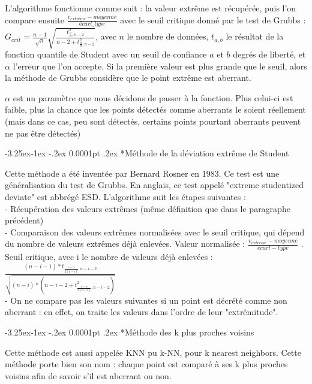 \documentclass[a4paper,12pt]{article} %
\makeatletter
\renewcommand\subparagraph{\@startsection{subparagraph}{5}{\z@}%
                                      {-3.25ex\@plus -1ex \@minus -.2ex}%
                                      {0.0001pt \@plus .2ex}%
                                      {\normalfont\normalsize\bfseries}}
\makeatother
\begin{document}
                        L'algorithme fonctionne comme suit : la valeur extrême est récupérée, puis l'on compare ensuite $\frac{v_{extrême}-moyenne}{écart\_type}$ avec le seuil critique donné par le test de Grubbs : $G_{crit} = \frac{n-1}{\sqrt{n}}\sqrt{\frac{t^2_{\frac{\alpha}{n},n-2}}{n-2+t^2_{\frac{\alpha}{n},n-2}}}$, avec $n$ le nombre de données, $t_{a,b}$ le résultat de la fonction quantile de Student avec un seuil de conﬁance $a$ et $b$ degrés de liberté, et $\alpha$ l’erreur que l’on accepte. Si la première valeur est plus grande que le seuil, alors la méthode de Grubbs considère que le point extrême est aberrant.
                        
                        $\alpha$ est un paramètre que nous décidons de passer à la fonction. Plus celui-ci est faible, plus la chance que les points détectés comme aberrants le soient réellement (mais dans ce cas, peu sont détectés, certains points pourtant aberrants peuvent ne pas être détectés)


					\subparagraph*{Méthode de la déviation extrême de Student}
					
                        Cette méthode a été inventée par Bernard Rosner en 1983. Ce test est une généralisation du test de Grubbs. En anglais, ce test appelé "extreme studentized deviate" est abbrégé ESD. L’algorithme suit les étapes suivantes : \\
                        - Récupération des valeurs extrêmes (même déﬁnition que dans le paragraphe précédent)\\
                        - Comparaison des valeurs extrêmes normalisées avec le seuil critique, qui dépend du nombre de valeurs extrêmes déjà enlevées. Valeur normalisée : $\frac{v_{extreme}-moyenne}{ecart-type}$ . Seuil critique, avec i le nombre de valeurs déjà enlevées : 
                        $\frac{    (n-i-1)*t _{     \frac{1-\alpha}{2(n-i)},n-i-2     }       }  {        \sqrt{       (n-i)*(n-i-2+t^2_{   \frac{1-\alpha}{2(n-i)},n-i-2} )      }     }  $ \\
                         - On ne compare pas les valeurs suivantes si un point est décrété comme non aberrant : en eﬀet, on traite les valeurs dans l’ordre de leur "extrêmitude".

				
					\subparagraph*{Méthode des k plus proches voisins}
					
					    Cette méthode est aussi appelée KNN pu k-NN, pour k nearest neighbors.
    					Cette méthode porte bien son nom : chaque point est comparé à ses k plus proches voisins afin de savoir s'il est aberrant ou non.\\
    					
\end{document}
